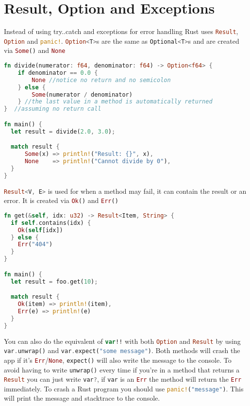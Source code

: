 \documentclass[a4paper,11pt]{article}
\begin{document}
\renewcommand{\arraystretch}{1}

\newpage
\section{Result, Option and Exceptions}
Instead of using try..catch and exceptions for error handling Rust uses \lstinline[language=Rust]{Result}, \lstinline[language=Rust]{Option} and \lstinline[language=Rust]{panic!}.
\newline
\newline
\lstinline[language=Rust]{Option<T>}s are the same as \lstinline[language=Kotlin]{Optional<T>}s and are created via \lstinline[language=Rust]{Some()} and \lstinline[language=Rust]{None}
\begin{lstlisting}[language=Rust,frame=single]
fn divide(numerator: f64, denominator: f64) -> Option<f64> {
    if denominator == 0.0 {
        None //notice no return and no semicolon
    } else {
        Some(numerator / denominator)
    } //the last value in a method is automatically returned
}  //assuming no return call

fn main() {
  let result = divide(2.0, 3.0);

  match result {
      Some(x) => println!("Result: {}", x),
      None    => println!("Cannot divide by 0"),
  }
}
\end{lstlisting}

\lstinline[language=Rust]{Result<V, E>} is used for when a method may fail, it can contain the result or an error. It is created via \lstinline[language=Rust]{Ok()} and \lstinline[language=Rust]{Err()}

\begin{lstlisting}[language=Rust,frame=single]
fn get(&self, idx: u32) -> Result<Item, String> {
  if self.contains(idx) {
    Ok(self[idx])
  } else {
    Err("404")
  }
}

fn main() {
  let result = foo.get(10);

  match result {
    Ok(item) => println!(item),
    Err(e) => println!(e)
  }
}
\end{lstlisting}

You can also do the equivalent of \lstinline[language=Kotlin]{var!!} with both \lstinline[language=Rust]{Option} and \lstinline[language=Rust]{Result} by using \lstinline[language=Rust]{var.unwrap()} and \lstinline[language=Rust]{var.expect("some message")}. Both methods will crash the app if it's \lstinline[language=Rust]{Err}/\lstinline[language=Rust]{None}, \lstinline[language=Rust]{expect()} will also write the message to the console.
\newline
To avoid having to write \lstinline[language=Rust]{unwrap()} every time if you're in a method that returns a \lstinline[language=Rust]{Result} you can just write \lstinline[language=Rust]{var?}, if \lstinline{var} is an \lstinline[language=Rust]{Err} the method will return the \lstinline[language=Rust]{Err} immediately.
\newline
To crash a Rust program you should use \lstinline[language=Rust]{panic!("message")}. This will print the message and stacktrace to the console.
\end{document}
